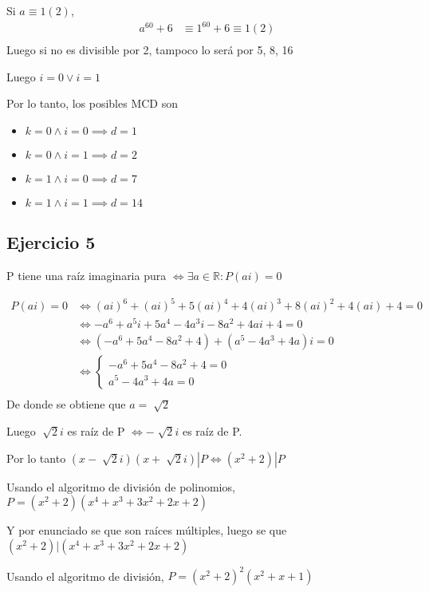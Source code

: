 Si $ a \equiv 1(2) $,
\begin{align*}
    a^{60} + 6 &\equiv 1^{60} + 6 \equiv 1 (2) \\
\end{align*}
Luego si no es divisible por 2, tampoco lo será por 5, 8, 16

Luego $ i = 0 \vee i = 1 $

Por lo tanto, los posibles MCD son
\begin{itemize}
    \item $ k = 0 \wedge i = 0 \implies d = 1 $
    \item $ k = 0 \wedge i = 1 \implies d = 2 $
    \item $ k = 1 \wedge i = 0 \implies d = 7 $
    \item $ k = 1 \wedge i = 1 \implies d = 14 $
\end{itemize}

\subsection{Ejercicio 5}

P tiene una raíz imaginaria pura $ \iff \exists a \in \mathbb{R}: P(ai) = 0 $

\begin{align*}
    P(ai) = 0 &\iff (ai)^6 + (ai)^5 + 5(ai)^4 + 4(ai)^3 + 8(ai)^2 + 4(ai) + 4 = 0 \\
    &\iff -a^6 + a^5i + 5a^4 - 4a^3i - 8a^2 + 4ai + 4 = 0 \\
    &\iff (-a^6 + 5a^4 - 8a^2 + 4) + (a^5 - 4a^3 + 4a)i = 0 \\
    &\iff \begin{cases}
        -a^6 + 5a^4 - 8a^2 + 4 = 0 \\
        a^5 - 4a^3 + 4a = 0
    \end{cases} \\
\end{align*}
De donde se obtiene que $ a = \sqrt[]{2} $

Luego $ \sqrt[]{2}i $ es raíz de P $ \iff -\sqrt[]{2}i $ es raíz de P.

Por lo tanto $ (x-\sqrt[]{2}i)(x+\sqrt[]{2}i)|P \iff (x^2 + 2)|P $

Usando el algoritmo de división de polinomios, $ P = (x^2 + 2)(x^4 + x^3 + 3x^2 + 2x + 2) $

Y por enunciado se que son raíces múltiples, luego se que $ (x^2 + 2) | (x^4 + x^3 + 3x^2 + 2x + 2) $

Usando el algoritmo de división, $ P = (x^2 + 2)^2(x^2 + x + 1) $

